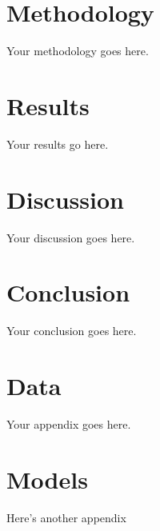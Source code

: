 \documentclass[12pt]{article}
\begin{document}

\section{Methodology}\label{sect:methodology}
Your methodology goes here.

\section{Results}\label{sect:results}
Your results go here.

\section{Discussion}\label{sect:discussion}
Your discussion goes here.

\section{Conclusion}\label{sect:conclusion}
Your conclusion goes here.

\pagebreak
\printbibliography{}
\pagebreak
\appendix

\section{Data}
Your appendix goes here.

\section{Models}
Here's another appendix
\end{document}
